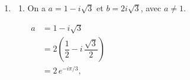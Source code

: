\documentclass[12pt,a4paper]{article}
\begin{document}
\begin{enumerate}
\begin{enumerate}
    \item Comme $b \neq 0$,

    $
    \begin{aligned}
    z^3 = b^3 &\iff \left(\dfrac{z}{b}\right)^3 = 1 \\[1mm]
              &\iff \dfrac{z}{b} \in \{1\,;\,j\,;\,j^2\} \\[1mm]
              &\iff z \in \{b\,;\,bj\,;\,bj^2\}.
    \end{aligned}
    $

    On calcule sous forme algébrique, en utilisant $j = e^{2i\pi/3}$ :

    $
    \begin{aligned}
    bj &= 2\,e^{i\pi/12}\,e^{2i\pi/3} \\[1mm]
       &= 2\,e^{3i\pi/4} \\[1mm]
       &= 2\left(-\dfrac{\sqrt2}{2} + i\,\dfrac{\sqrt2}{2}\right) \\[1mm]
       &= -\sqrt2 + i\sqrt2,
    \end{aligned}
    $

    $
    \begin{aligned}
    bj^2 &= 2\,e^{i\pi/12}\,e^{4i\pi/3} \\[1mm]
         &= 2\,e^{17i\pi/12} \\[1mm]
         &= 2\left(-\cos\dfrac{5\pi}{12} - i\sin\dfrac{5\pi}{12}\right) \\[1mm]
         &= 2\left(-\dfrac{\sqrt6 - \sqrt2}{4} - i\,\dfrac{\sqrt6 + \sqrt2}{4}\right) \\[1mm]
         &= \dfrac{\sqrt2 - \sqrt6}{2} - i\,\dfrac{\sqrt6 + \sqrt2}{2}.
    \end{aligned}
    $

    \[
    \boxed{S = \left\{\,\dfrac{\sqrt6 + \sqrt2}{2} + i\,\dfrac{\sqrt6 - \sqrt2}{2}\,;\ -\sqrt2 + i\sqrt2\,;\ \dfrac{\sqrt2 - \sqrt6}{2} - i\,\dfrac{\sqrt6 + \sqrt2}{2}\,\right\}}
    \]

\end{enumerate}

\item

\begin{enumerate}

    \item On a $a = 1 - i\sqrt3$ et $b = 2i\sqrt3$, avec $a \neq 1$.

    $
    \begin{aligned}
    a &= 1 - i\sqrt3 \\[1mm]
      &= 2\left(\dfrac12 - i\,\dfrac{\sqrt3}{2}\right) \\[1mm]
      &= 2\,e^{-i\pi/3},
    \end{aligned}
    $


\end{enumerate}
\end{enumerate}
\end{document}
